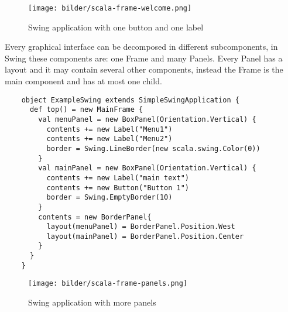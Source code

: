 \documentclass[
	a4paper,					10pt,							twoside,					openright,				notitlepage,			parskip=half,			]{scrreprt}
\begin{document}
\begin{figure}[h]
\begin{center}
\texttt{[image: bilder/scala-frame-welcome.png]}
\caption{Swing application with one button and one label}
\end{center}
\end{figure}
Every graphical interface can be decomposed in different subcomponents, in Swing these components are: one Frame and many Panels.
Every Panel has a layout and it may contain several other components, instead the Frame is the main component and has at most one child.
\begin{lstlisting}
    object ExampleSwing extends SimpleSwingApplication {
      def top() = new MainFrame {
        val menuPanel = new BoxPanel(Orientation.Vertical) {
          contents += new Label("Menu1")
          contents += new Label("Menu2")
          border = Swing.LineBorder(new scala.swing.Color(0))
        }
        val mainPanel = new BoxPanel(Orientation.Vertical) {
          contents += new Label("main text")
          contents += new Button("Button 1")
          border = Swing.EmptyBorder(10)
        }
        contents = new BorderPanel{
          layout(menuPanel) = BorderPanel.Position.West
          layout(mainPanel) = BorderPanel.Position.Center
        }        
      }
    }
\end{lstlisting}
\begin{figure}[h]
\begin{center}
\texttt{[image: bilder/scala-frame-panels.png]}
\caption{Swing application with more panels}
\end{center}
\end{figure}
\end{document}

